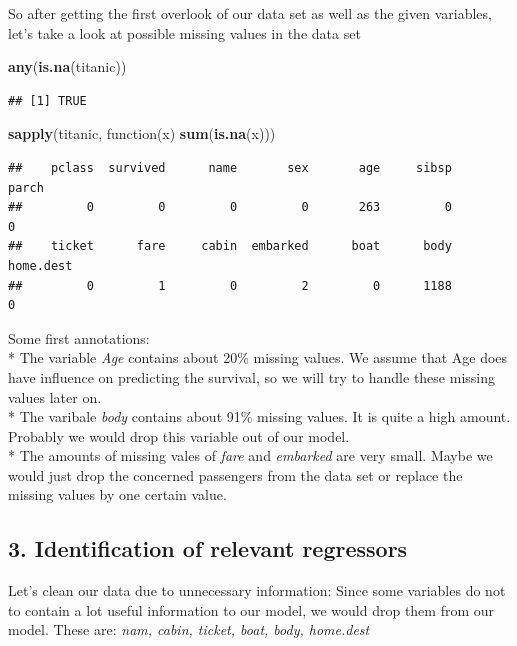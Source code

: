 \documentclass[12,]{article}
\newenvironment{Shaded}{\begin{snugshade}}{\end{snugshade}}
\newcommand{\KeywordTok}[1]{\textcolor[rgb]{0.13,0.29,0.53}{\textbf{{#1}}}}
\newcommand{\NormalTok}[1]{{#1}}
\begin{document}
So after getting the first overlook of our data set as well as the given
variables, let's take a look at possible missing values in the data set

\begin{Shaded}
\begin{Highlighting}[]
\KeywordTok{any}\NormalTok{(}\KeywordTok{is.na}\NormalTok{(titanic))}
\end{Highlighting}
\end{Shaded}

\begin{verbatim}
## [1] TRUE
\end{verbatim}

\begin{Shaded}
\begin{Highlighting}[]
\KeywordTok{sapply}\NormalTok{(titanic, function(x) }\KeywordTok{sum}\NormalTok{(}\KeywordTok{is.na}\NormalTok{(x)))}
\end{Highlighting}
\end{Shaded}

\begin{verbatim}
##    pclass  survived      name       sex       age     sibsp     parch 
##         0         0         0         0       263         0         0 
##    ticket      fare     cabin  embarked      boat      body home.dest 
##         0         1         0         2         0      1188         0
\end{verbatim}

Some first annotations:\\
* The variable \emph{Age} contains about 20\% missing values. We assume
that Age does have influence on predicting the survival, so we will try
to handle these missing values later on.\\
* The varibale \emph{body} contains about 91\% missing values. It is
quite a high amount. Probably we would drop this variable out of our
model.\\
* The amounts of missing vales of \emph{fare} and \emph{embarked} are
very small. Maybe we would just drop the concerned passengers from the
data set or replace the missing values by one certain value.

\subsection{3. Identification of relevant
regressors}\label{identification-of-relevant-regressors}

Let's clean our data due to unnecessary information: Since some
variables do not to contain a lot useful information to our model, we
would drop them from our model. These are: \emph{nam, cabin, ticket,
boat, body, home.dest}
\end{document}

